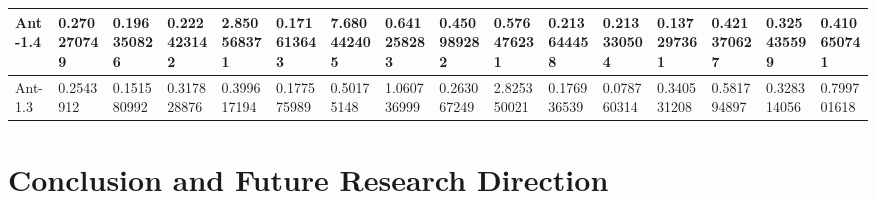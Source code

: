 \documentclass[12pt]{report}
\begin{document}
\begin{table}[h]
\begin{tabular}{|l|l|l|l|l|l|l|l|l|l|l|l|l|l|l|l|}
Ant-1.4 &0.270270749&	0.196350826&	0.222423142&
2.850568371&	0.171613643&	7.680442405&
0.641258283&	0.450989282&	0.576476231&
0.213644458&	0.213330504&	0.137297361&
0.421370627&	0.325435599&	0.410650741   \\ \hline

Ant-1.3  &0.2543912&	0.151580992&	0.317828876&
0.399617194&	0.177575989&	0.50175148&
1.060736999&	0.263067249&	2.825350021&
0.176936539&	0.078760314&	0.340531208&
0.581794897&	0.328314056&	0.799701618    \\ \hline

\end{tabular}
\end{table}





\chapter{Conclusion and Future Research Direction}


\begin{singlespace}


\end{singlespace}
\end{document}

